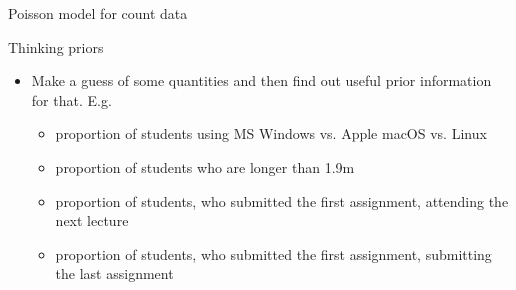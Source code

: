 \documentclass[english,t]{beamer}
\begin{document}
\begin{frame}{Poisson model for count data}
  
\end{frame}

\begin{frame}{Thinking priors}

  \begin{itemize}
  \item Make a guess of some quantities and then find out useful
    prior information for that. E.g.
    \begin{itemize}
    \item proportion of students using MS Windows vs. Apple macOS vs. Linux
    \item proportion of students who are longer than 1.9m
    \item proportion of students, who submitted the first assignment,
      attending the next lecture
    \item proportion of students, who submitted the first assignment,
      submitting the last assignment
    \end{itemize}
  \end{itemize}
  
\end{frame}
\end{document}
